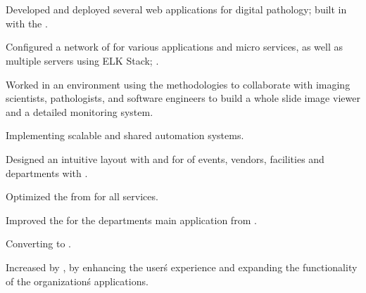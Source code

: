 \documentclass{article}%
\begin{document}
\begin{minipage}{0.55\textwidth}
\section*{}%
\label{sec:customboldExperience}%
%
%
%
\begin{tightemize}%
\item Developed and deployed several web applications for digital pathology; built in  with the .%
\item Configured a network of  for various applications and micro services, as well as multiple servers using ELK Stack; .%
\item Worked in an  environment using the  methodologies to collaborate with imaging scientists, pathologists, and software engineers to build a whole slide image viewer and a detailed monitoring system.%
\end{tightemize}%
%
%
%
\begin{tightemize}%
\item Implementing scalable and shared  automation systems.%
\item Designed an intuitive layout with  and  for  of events, vendors, facilities and departments with .%
\item Optimized the  from  for all services.%
\item Improved the  for the departments main application from .%
\item Converting  to .%
\item Increased  by , by enhancing the user\'s experience and expanding the functionality of the organization\'s applications.%
\end{tightemize}%
%
%
%
\begin{tightemize}%

\end{tightemize}
\end{minipage}
\end{document}
